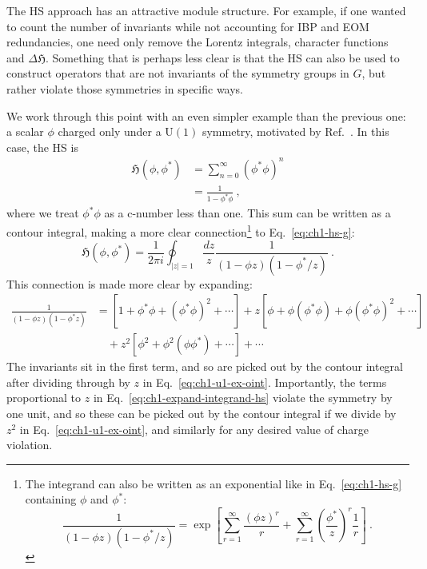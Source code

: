 The HS approach has an attractive module structure. For example, if one wanted
to count the number of invariants while not accounting for IBP and EOM
redundancies, one need only remove the Lorentz integrals, character functions
and $\Delta \mathfrak{H}$. Something that is perhaps less clear is that the HS
can also be used to construct operators that are not invariants of the symmetry
groups in $G$, but rather violate those symmetries in specific ways.

We work through this point with an even simpler example than the previous one: a
scalar $\phi$ charged only under a $\mathrm{U}(1)$ symmetry, motivated by
Ref.~\cite{Lehman:2015via}. In this case, the HS is
\begin{align}
  \mathfrak{H}(\phi, \phi^{*}) &= \sum_{n=0}^{\infty} (\phi^{*}\phi)^{n} \\
  &= \frac{1}{1 - \phi^{*} \phi} \ ,
\end{align}
where we treat $\phi^{*}\phi$ as a c-number less than one. This sum can be
written as a contour integral, making a more clear connection\footnote{The
  integrand can also be written as an exponential like in Eq.~\eqref{eq:ch1-hs-g}
  containing $\phi$ and $\phi^{*}$:
\begin{equation*}
  \frac{1}{(1 - \phi z)(1 - \phi^{*}/z)} = \exp \left[ \sum_{r=1}^{\infty} \frac{(\phi z)^{r}}{r} + \sum_{r=1}^{\infty} \left(\frac{\phi^{*}}{z}\right)^{r}\frac{1}{r} \right] \ .
\end{equation*}} to
Eq.~\eqref{eq:ch1-hs-g}:
\begin{equation}
  \label{eq:ch1-u1-ex-oint}
  \mathfrak{H}(\phi, \phi^{*}) = \frac{1}{2\pi i} \oint_{|z|=1} \frac{dz}{z} \frac{1}{(1 - \phi z)(1 - \phi^{*}/z)} \ .
\end{equation}
This connection is made more clear by expanding:
\begin{equation}
  \label{eq:ch1-expand-integrand-hs}
  \begin{aligned}
  \frac{1}{(1 - \phi z)(1 - \phi^{*} z)} &= [1 + \phi^{*}\phi + (\phi^{*}\phi)^{2} + \cdots] + z [\phi + \phi (\phi^{*}\phi) + \phi(\phi^{*}\phi)^{2} + \cdots] \\
 &\quad + z^2 [\phi^2 + \phi^2 (\phi \phi^*) + \cdots] + \cdots
  \end{aligned}
\end{equation}
The invariants sit in the first term, and so are picked out by the contour
integral after dividing through by $z$ in Eq.~\eqref{eq:ch1-u1-ex-oint}.
Importantly, the terms proportional to $z$ in Eq.~\eqref{eq:ch1-expand-integrand-hs}
violate the symmetry by one unit, and so these can be picked out by the contour
integral if we divide by $z^{2}$ in Eq.~\eqref{eq:ch1-u1-ex-oint}, and similarly for
any desired value of charge violation.

